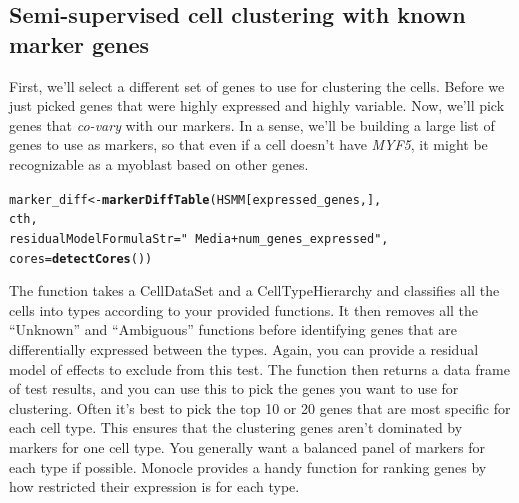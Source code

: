 \documentclass[10pt,oneside]{article}\usepackage[]{graphicx}\usepackage[]{color}
\makeatletter
\newcommand{\hlstr}[1]{\textcolor[rgb]{0.192,0.494,0.8}{#1}}%
\newcommand{\hlstd}[1]{\textcolor[rgb]{0.345,0.345,0.345}{#1}}%
\newcommand{\hlkwb}[1]{\textcolor[rgb]{0.69,0.353,0.396}{#1}}%
\newcommand{\hlkwc}[1]{\textcolor[rgb]{0.333,0.667,0.333}{#1}}%
\newcommand{\hlkwd}[1]{\textcolor[rgb]{0.737,0.353,0.396}{\textbf{#1}}}%
\newenvironment{kframe}{%
 \def\at@end@of@kframe{}%
 \ifinner\ifhmode%
  \def\at@end@of@kframe{\end{minipage}}%
  \begin{minipage}{\columnwidth}%
 \fi\fi%
 \def\FrameCommand##1{\hskip\@totalleftmargin \hskip-\fboxsep
 \colorbox{shadecolor}{##1}\hskip-\fboxsep
     \hskip-\linewidth \hskip-\@totalleftmargin \hskip\columnwidth}%
 \MakeFramed {\advance\hsize-\width
   \@totalleftmargin\z@ \linewidth\hsize
   \@setminipage}}%
 {\par\unskip\endMakeFramed%
 \at@end@of@kframe}
\newenvironment{knitrout}{}{} %
\makeatother
\begin{document}
\subsection{Semi-supervised cell clustering with known marker genes}
  
First, we'll select a different set of genes to use for clustering the cells. Before we just picked genes that were highly expressed and highly variable. Now, we'll pick genes that \emph{co-vary} with our markers. In a sense, we'll be building a large list of genes to use as markers, so that even if a cell doesn't have \emph{MYF5}, it might be recognizable as a myoblast based on other genes.
  
\begin{knitrout}
\color{fgcolor}\begin{kframe}
\begin{alltt}
\hlstd{marker_diff} \hlkwb{<-} \hlkwd{markerDiffTable}\hlstd{(HSMM[expressed_genes,],}
                                 \hlstd{cth,}
                                 \hlkwc{residualModelFormulaStr}\hlstd{=}\hlstr{"~Media + num_genes_expressed"}\hlstd{,}
                                 \hlkwc{cores}\hlstd{=}\hlkwd{detectCores}\hlstd{())}
\end{alltt}
\end{kframe}
\end{knitrout}
The function  takes a CellDataSet and a CellTypeHierarchy and classifies all the cells into types according to your provided functions. It then removes all the ``Unknown'' and ``Ambiguous'' functions before identifying genes that are differentially expressed between the types. Again, you can provide a residual model of effects to exclude from this test. The function then returns a data frame of test results, and you can use this to pick the genes you want to use for clustering. Often it's best to pick the top 10 or 20 genes that are most specific for each cell type. This ensures that the clustering genes aren't dominated by markers for one cell type. You generally want a balanced panel of markers for each type if possible. Monocle provides a handy function for ranking genes by how restricted their expression is for each type.  
\end{document}
